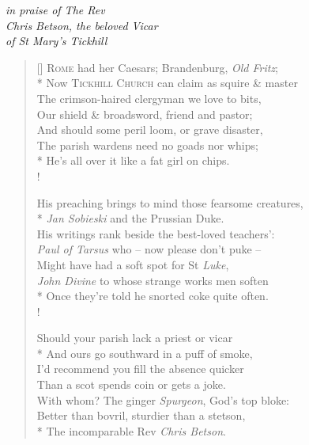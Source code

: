 \begin{center}
\textit{in praise of The Rev}\\
\textit{Chris Betson, the beloved Vicar}\\
\textit{of St Mary's Tickhill}
\end{center}

\bigskip

\settowidth{\versewidth}{His preaching brings to mind those fearsome creatures,}
\begin{verse}[\versewidth]
\textsc{Rome} had her Caesars; Brandenburg, \textit{Old Fritz};\\*
\vin Now \textsc{Tickhill Church} can claim as squire \& master\\
The crimson-haired clergyman we love to bits,\\
\vin Our shield \& broadsword, friend and pastor;\\
\vin And should some peril loom, or grave disaster,\\
The parish wardens need no goads nor whips;\\*
He's all over it like a fat girl on chips.\\!

His preaching brings to mind those fearsome creatures,\\*
\vin \textit{Jan Sobieski} and the Prussian Duke.\\
His writings rank beside the best-loved teachers':\\
\vin \textit{Paul of Tarsus} who -- now please don't puke --\\
\vin Might have had a soft spot for St \textit{Luke},\\
\textit{John Divine} to whose strange works men soften\\*
Once they're told he snorted coke quite often.\\!

Should your parish lack a priest or vicar\\*
\vin And ours go southward in a puff of smoke,\\
I'd recommend you fill the absence quicker\\
\vin Than a scot spends coin or gets a joke.\\
\vin With whom? The ginger \textit{Spurgeon}, God's top bloke:\\
Better than bovril, sturdier than a stetson,\\*
The incomparable Rev \textit{Chris Betson}.
\end{verse}
